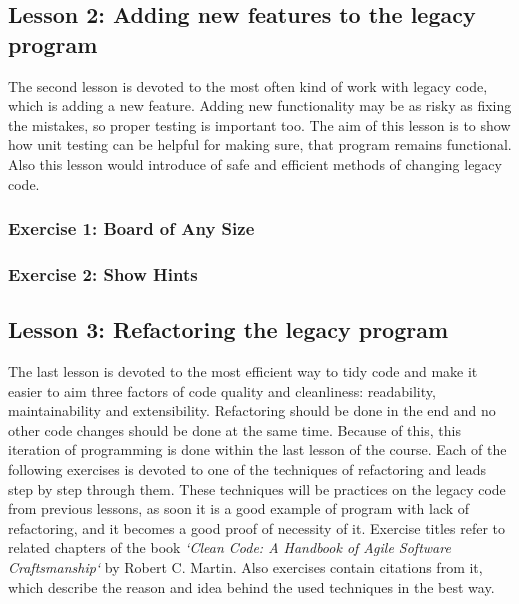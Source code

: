     
    \subsection{Lesson 2: Adding new features to the legacy program}
    The second lesson is devoted to the most often kind of work with legacy code, which is adding a new feature. Adding new functionality may be as risky as fixing the mistakes, so proper testing is important too. The aim of this lesson is to show how unit testing can be helpful for making sure, that program remains functional. Also this lesson would introduce of safe and efficient methods of changing legacy code.
    
        \subsubsection{Exercise 1: Board of Any Size}
        
        \subsubsection{Exercise 2: Show Hints}
        
    
    \subsection{Lesson 3: Refactoring the legacy program}
    The last lesson is devoted to the most efficient way to tidy code and make it easier to aim three factors of code quality and cleanliness: readability, maintainability and extensibility. Refactoring should be done in the end and no other code changes should be done at the same time. Because of this, this iteration of programming is done within the last lesson of the course. Each of the following exercises is devoted to one of the techniques of refactoring and leads step by step through them. These techniques will be practices on the legacy code from previous lessons, as soon it is a good example of program with lack of refactoring, and it becomes a good proof of necessity of it. Exercise titles refer to related chapters of the book \textit{`Clean Code: A Handbook of Agile Software Craftsmanship`} by Robert C. Martin. Also exercises contain citations from it, which describe the reason and idea behind the used techniques in the best way.
    
